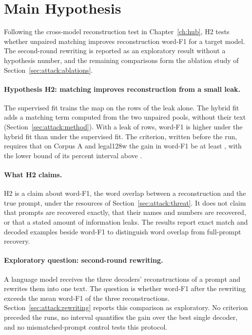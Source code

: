 \section{Main Hypothesis}\label{sec:attack:hypotheses}

Following the cross-model reconstruction test in Chapter~\ref{ch:hub}, H2 tests whether unpaired matching improves reconstruction word-F1 for a target model.
The second-round rewriting is reported as an exploratory result without a hypothesis number, and the remaining comparisons form the ablation study of Section~\ref{sec:attack:ablations}.

\paragraph{Hypothesis H2: matching improves reconstruction from a small leak.} The supervised fit trains the map on the rows of the leak alone.
The hybrid fit adds a matching term computed from the two unpaired pools, without their text (Section~\ref{sec:attack:method}).
With a leak of  rows, word-F1 is higher under the hybrid fit than under the supervised fit.
The criterion, written before the run, requires that on Corpus A and legal128w the gain in word-F1 be at least , with the lower bound of its  percent interval above . %

\paragraph{What H2 claims.} H2 is a claim about word-F1, the word overlap between a reconstruction and the true prompt, under the resources of Section~\ref{sec:attack:threat}.
It does not claim that prompts are recovered exactly, that their names and numbers are recovered, or that a stated amount of information leaks.
The results report exact match and decoded examples beside word-F1 to distinguish word overlap from full-prompt recovery.

\paragraph{Exploratory question: second-round rewriting.} A language model receives the three decoders' reconstructions of a prompt and rewrites them into one text.
The question is whether word-F1 after the rewriting exceeds the mean word-F1 of the three reconstructions.
Section~\ref{sec:attack:rewriting} reports this comparison as exploratory.
No criterion preceded the runs, no interval quantifies the gain over the best single decoder, and no mismatched-prompt control tests this protocol.
